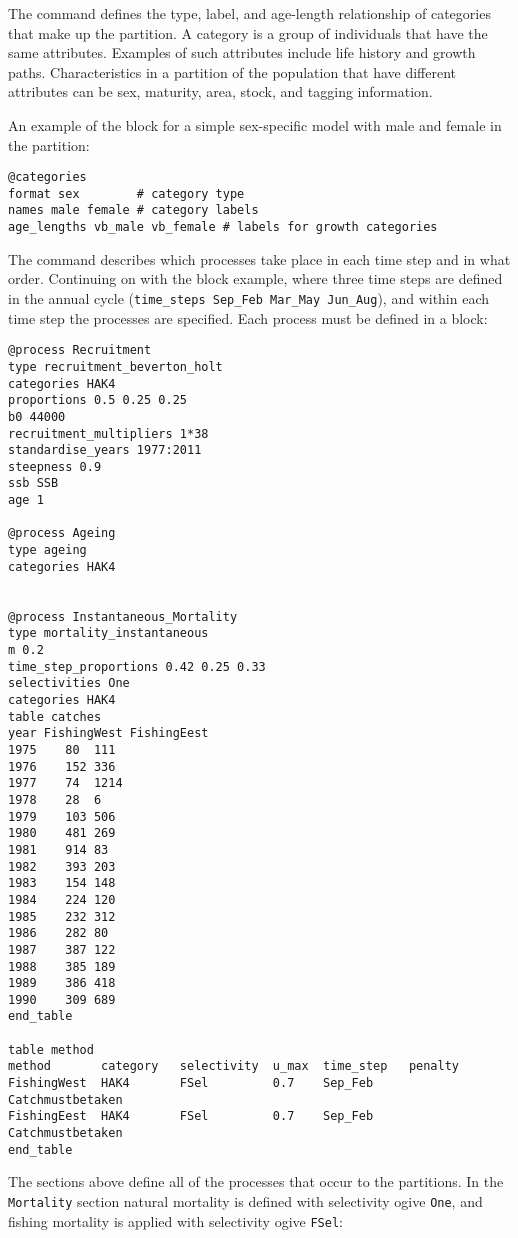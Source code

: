 The  command defines the type, label, and age-length relationship of categories that make up the partition. A category is a group of individuals that have the same attributes. Examples of such attributes include life history and growth paths. Characteristics in a partition of the population that have different attributes can be sex, maturity, area, stock, and tagging information.

An example of the  block for a simple sex-specific model with male and female in the partition:

{\small{\begin{verbatim}
@categories
format sex        # category type
names male female # category labels
age_lengths vb_male vb_female # labels for growth categories
		\end{verbatim}}}

The  command describes which processes take place in each time step and in what order. Continuing on with the  block example, where three time steps are defined in the annual cycle (\texttt{time\_steps Sep\_Feb Mar\_May Jun\_Aug}), and within each time step the processes are specified. Each process must be defined in a  block:

{\small{\begin{verbatim}
@process Recruitment
type recruitment_beverton_holt
categories HAK4
proportions 0.5 0.25 0.25
b0 44000
recruitment_multipliers 1*38
standardise_years 1977:2011
steepness 0.9
ssb SSB
age 1

@process Ageing
type ageing
categories HAK4

		
@process Instantaneous_Mortality
type mortality_instantaneous
m 0.2
time_step_proportions 0.42 0.25 0.33
selectivities One
categories HAK4
table catches
year FishingWest FishingEest
1975	80	111
1976	152	336
1977	74	1214
1978	28	6
1979	103	506
1980	481	269
1981	914	83
1982	393	203
1983	154	148
1984	224	120
1985	232	312
1986	282	80
1987	387	122
1988	385	189
1989	386	418
1990	309	689
end_table
		
table method
method  	 category 	selectivity  u_max 	time_step 	penalty
FishingWest  HAK4   	FSel 		 0.7 	Sep_Feb 	Catchmustbetaken
FishingEest  HAK4   	FSel 		 0.7 	Sep_Feb 	Catchmustbetaken
end_table
\end{verbatim}}}

The sections above define all of the processes that occur to the partitions. In the \texttt{Mortality} section natural mortality is defined with selectivity ogive \texttt{One}, and fishing mortality is applied with selectivity ogive \texttt{FSel}:

